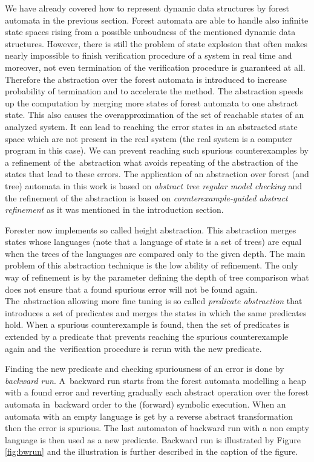 \documentclass[fleqn,11pt]{ExcelAtFIT} %
\begin{document}
We have already covered how to represent dynamic data structures by forest automata in the previous section.
Forest automata are able to handle also infinite state spaces
rising from a possible unboudness of the mentioned dynamic data structures.
However, there is still the problem of state explosion that often makes
nearly impossible to finish verification procedure of a system in real time
and moreover, not even termination of the verification procedure is guaranteed at all.
Therefore the abstraction over the forest automata is introduced to increase probability of termination
and to accelerate the method.
The abstraction speeds up the computation by merging more states
of forest automata to one abstract state.
This also causes the overapproximation of the set of reachable
states of an analyzed system.
It can lead to reaching the error states in
an abstracted state space which are not present in the real system (the real system is a computer program in this case).
We can prevent reaching such spurious counterexamples by a refinement of the~abstraction
what avoids repeating of the abstraction of the states that lead to these errors.
The application of an abstraction over forest (and tree) automata in this work is based on \emph{abstract tree regular model checking} \cite{artmc}
and the refinement of the abstraction is based on \emph{counterexample-guided abstract refinement} \cite{cegar}
as it was mentioned in the introduction section.

Forester now implements so called height abstraction.
This abstraction merges states whose languages (note that a language of state is a set of trees) are equal
when the trees of the languages are compared only to the given depth.
The main problem of this abstraction technique is the low ability of refinement.
The only way of refinement is by the parameter defining the depth of tree comparison
what does not ensure that a found spurious error will not be found again.
The~abstraction allowing more fine tuning is so called \emph{predicate abstraction} \cite{artmc}
that introduces a set of predicates and merges the states in which the same predicates hold.
When a spurious counterexample is found, then the set of predicates is extended by
a predicate that prevents reaching the spurious counterexample again
and the~verification procedure is rerun with the new predicate.

Finding the new predicate and checking spuriousness of an error is done by \emph{backward run}.
A~backward run starts from the forest automata modelling a heap with a found error and
reverting gradually each abstract operation over the forest automata
in~backward order to the (forward) symbolic execution.
When an automata with an empty language is get by a reverse abstract transformation then the error is spurious.
The last automaton of backward run with a non empty language is then used as a new predicate.
Backward run is illustrated by Figure \ref{fig:bwrun} and the illustration
is further described in the caption of the figure.
\end{document}

